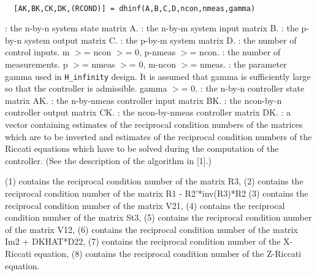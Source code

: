 \begin{mandesc}
   \\ %
\end{mandesc}
\begin{calling_sequence}
\begin{verbatim}
  [AK,BK,CK,DK,(RCOND)] = dhinf(A,B,C,D,ncon,nmeas,gamma)  
\end{verbatim}
\end{calling_sequence}
\begin{parameters}
  \begin{varlist}
    : the n-by-n system state matrix A.
    : the n-by-m system input matrix B.
    : the p-by-n system output matrix C.
    : the p-by-m system matrix D.
    : the number of control inputs. m $>$= ncon $>$= 0, p-nmeas $>$= ncon.
    : the number of measurements. p $>$= nmeas $>$= 0, m-ncon $>$= nmeas.
    : the parameter gamma used in \verb!H_infinity! design. It is assumed that
    gamma is sufficiently large so that the controller is admissible. gamma $>$= 0.
    : the n-by-n controller state matrix AK.
    : the n-by-nmeas controller input matrix BK.
    : the ncon-by-n controller output matrix CK.
    : the ncon-by-nmeas controller matrix DK.
    : a vector containing estimates of the reciprocal condition numbers of
    the matrices which are to be inverted and estimates of the reciprocal condition numbers
    of the Riccati equations which have to be solved during the computation of the controller.
    (See the description of the algorithm in [1].)
    \begin{varlist}
       (1) contains the reciprocal condition number of the  matrix R3,
       (2) contains the reciprocal condition number of the  matrix R1 - R2'*inv(R3)*R2
       (3) contains the reciprocal condition number of the matrix V21,
       (4) contains the reciprocal condition number of the   matrix St3,
       (5) contains the reciprocal condition number of the  matrix V12,
       (6) contains the reciprocal condition number of the matrix Im2 + DKHAT*D22,
       (7) contains the reciprocal condition number of the  X-Riccati equation,
       (8) contains the reciprocal condition number of the  Z-Riccati equation.
    \end{varlist}
  \end{varlist}
\end{parameters}
